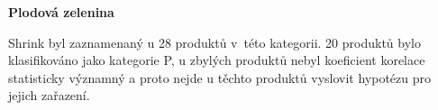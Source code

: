 \textbf{Plodová zelenina}

Shrink byl zaznamenaný u 28 produktů v~této kategorii. 20 produktů bylo klasifikováno jako kategorie P, u zbylých produktů nebyl koeficient korelace statisticky významný a proto nejde u těchto produktů vyslovit hypotézu pro jejich zařazení.




